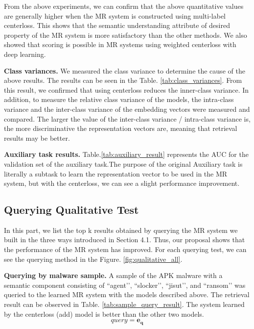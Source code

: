 From the above experiments, we can confirm that the above quantitative values ​​are generally higher when the MR system is constructed using multi-label centerloss. This shows that the semantic understanding attribute of desired property of the MR system is more satisfactory than the other methods. We also showed that scoring is possible in MR systems using weighted centerloss with deep learning.

\textbf{Class variances. }
We measured the class variance to determine the cause of the above results. The results can be seen in the Table. \ref{tab:class_variances}. From this result, we confirmed that using centerloss reduces the inner-class variance. In addition, to measure the relative class variance of the models, the intra-class variance and the inter-class variance of the embedding vectors were measured and compared. The larger the value of the inter-class variance / intra-class variance is, the more discriminative the representation vectors are, meaning that retrieval results may be better.

\textbf{Auxiliary task results. }
Table.\ref{tab:auxiliary_result} represents the AUC for the validation set of the auxiliary task.The purpose of the original Auxiliary task is literally a subtask to learn the representation vector to be used in the MR system, but with the centerloss, we can see a slight performance improvement.


\subsection{Querying Qualitative Test}
In this part, we list the top k results obtained by querying the MR system we built in the three ways introduced in Section 4.1. Thus, our proposal shows that the performance of the MR system has improved. For each querying test, we can see the querying method in the Figure. \ref{fig:qualitative_all}.

\textbf{Querying by malware sample. }
A sample of the APK malware with a semantic component consisting of ``agent’’, ``slocker’’, ``jisut’’, and ``ransom’’ was queried to the learned MR system with the models described above. The retrieval result can be observed in Table. \ref{tab:sample_query_result}. The system learned by the centerloss (add) model is better than the other two models.
\[
   query = \mathbf{e_q} 
\]


